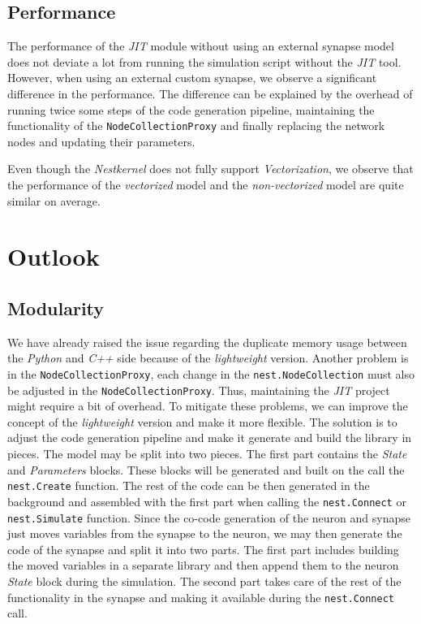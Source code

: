 \subsection*{Performance}

The performance of the \emph{JIT} module without using an external synapse model does not deviate a lot from running the simulation script without the \emph{JIT} tool. However, when using an external custom synapse, we observe a significant difference in the performance. The difference can be explained by the overhead of running twice some steps of the code generation pipeline, maintaining the functionality of the \texttt{NodeCollectionProxy} and finally replacing the network nodes and updating their parameters.

Even though the \emph{Nestkernel} does not fully support \emph{Vectorization}, we observe that the performance of the \emph{vectorized} model and the \emph{non-vectorized} model are quite similar on average.

\section{Outlook}

\subsection*{Modularity}

We have already raised the issue regarding the duplicate memory usage between the \emph{Python} and \emph{C++} side because of the \emph{lightweight} version. Another problem is in the \texttt{NodeCollectionProxy}, each change in the \texttt{nest.NodeCollection} must also be adjusted in the \texttt{NodeCollectionProxy}. Thus, maintaining the \emph{JIT} project might require a bit of overhead. To mitigate these problems, we can improve the concept of the \emph{lightweight} version and make it more flexible. The solution is to adjust the code generation pipeline and make it generate and build the library in pieces. The model may be split into two pieces. The first part contains the \emph{State} and \emph{Parameters} blocks. These blocks will be generated and built on the call the \texttt{nest.Create} function. The rest of the code can be then generated in the background and assembled with the first part when calling the \texttt{nest.Connect} or \texttt{nest.Simulate} function. Since the co-code generation of the neuron and synapse just moves variables from the synapse to the neuron, we may then generate the code of the synapse and split it into two parts. The first part includes building the moved variables in a separate library and then append them to the neuron \emph{State} block during the simulation. The second part takes care of the rest of the functionality in the synapse and making it available during the \texttt{nest.Connect} call.

